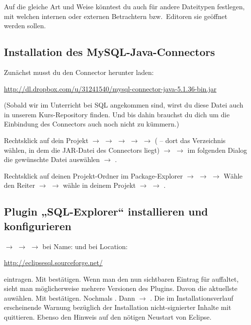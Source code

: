 Auf die gleiche Art und Weise könntest du auch für andere Dateitypen festlegen,
mit welchen internen oder externen Betrachtern bzw.\ Editoren sie geöffnet
werden sollen.


\subsection{Installation des
MySQL-Java-Connectors}\label{mysql-connector-installation}

Zunächst musst du den Connector herunter laden:

\url{http://dl.dropbox.com/u/31241540/mysql-connector-java-5.1.36-bin.jar}

(Sobald wir im Unterricht bei SQL angekommen sind, wirst du diese Datei auch in
unserem Kurs-Repository finden. Und bis dahin brauchst du dich um die
Einbindung des Connectors auch noch nicht zu kümmern.)

Rechtsklick auf dein Projekt $\rightarrow$  $\rightarrow$
 $\rightarrow$  $\rightarrow$ 
$\rightarrow$  ( -- dort das Verzeichnis
wählen, in dem die JAR-Datei des Connectors liegt) $\rightarrow$ 
$\rightarrow$ im folgenden Dialog die gewünschte Datei auswählen $\rightarrow$
.

Rechtsklick auf deinen Projekt-Ordner im Package-Explorer $\rightarrow$
 $\rightarrow$ 
$\rightarrow$ Wähle den Reiter  $\rightarrow$  $\rightarrow$ wähle  in
deinem Projekt $\rightarrow$  $\rightarrow$ .

\subsection{Plugin „SQL-Explorer“ installieren und konfigurieren}

 $\rightarrow$  $\rightarrow$
 $\rightarrow$ bei Name:  und bei Location:

\url{http://eclipsesql.sourceforge.net/} 

eintragen. Mit  bestätigen. Wenn man den nun sichtbaren Eintrag für
 auffaltet, sieht man möglicherweise mehrere Versionen des
Plugins. Davon die aktuellste auwählen. Mit  bestätigen. Nochmals
. Dann 
$\rightarrow$ . Die im Installationsverlauf erscheinende Warnung
bezüglich der Installation nicht-signierter Inhalte mit  quittieren.
Ebenso den Hinweis auf den nötigen Neustart von Eclipse.

